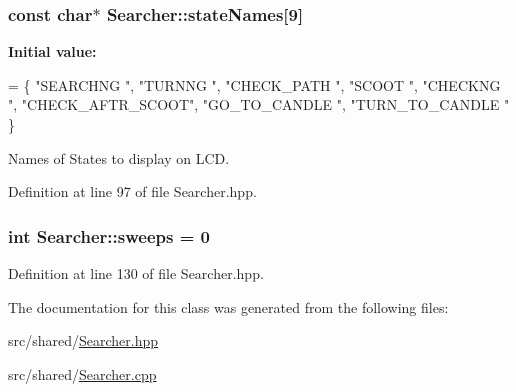 \hypertarget{classSearcher_a2403bbf24da371ea9a31eeaec1f98b96}{
\subsubsection[{state\-Names}]{\setlength{\rightskip}{0pt plus 5cm}const char$\ast$ Searcher\-::state\-Names\mbox{[}9\mbox{]}\hspace{0.3cm}{\ttfamily [private]}}}\label{classSearcher_a2403bbf24da371ea9a31eeaec1f98b96}
{\bfseries Initial value\-:}
\begin{DoxyCode}
= \{
      \textcolor{stringliteral}{"SEARCHNG        "},
      \textcolor{stringliteral}{"TURNNG          "},
      \textcolor{stringliteral}{"CHECK\_PATH      "},
      \textcolor{stringliteral}{"SCOOT           "},
      \textcolor{stringliteral}{"CHECKNG         "},
      \textcolor{stringliteral}{"CHECK\_AFTR\_SCOOT"},
      \textcolor{stringliteral}{"GO\_TO\_CANDLE    "},
      \textcolor{stringliteral}{"TURN\_TO\_CANDLE  "}
    \}
\end{DoxyCode}


Names of States to display on L\-C\-D. 



Definition at line 97 of file Searcher.\-hpp.

\hypertarget{classSearcher_af8a7e7ddce46577fca506e2f31aead60}{
\subsubsection[{sweeps}]{\setlength{\rightskip}{0pt plus 5cm}int Searcher\-::sweeps = 0\hspace{0.3cm}{\ttfamily [private]}}}\label{classSearcher_af8a7e7ddce46577fca506e2f31aead60}


Definition at line 130 of file Searcher.\-hpp.



The documentation for this class was generated from the following files\-:\begin{DoxyCompactItemize}
\item 
src/shared/\hyperlink{Searcher_8hpp}{Searcher.\-hpp}\item 
src/shared/\hyperlink{Searcher_8cpp}{Searcher.\-cpp}\end{DoxyCompactItemize}
